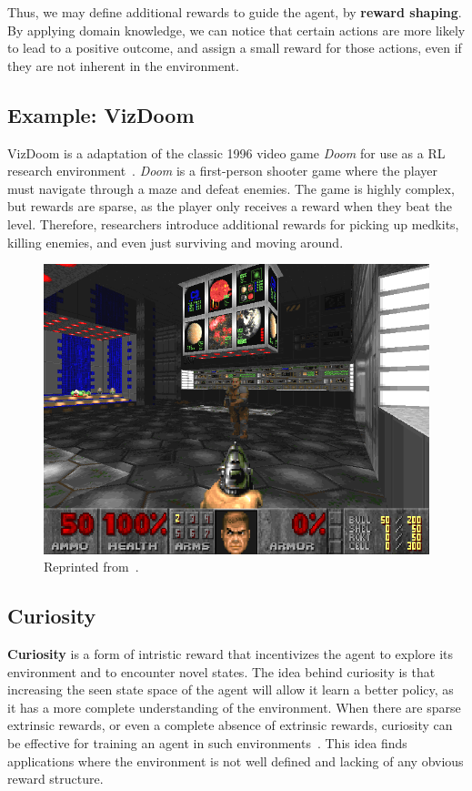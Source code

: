 \documentclass[12pt]{report}
\theoremstyle{definition}
\theoremstyle{remark}
\begin{document}
Thus, we may define additional rewards to guide the agent, by \textbf{reward shaping}. By applying domain knowledge, we can notice that certain actions are more likely to lead to a positive outcome, and assign a small reward for those actions, even if they are not inherent in the environment.

\subsection{Example: VizDoom}

VizDoom is a adaptation of the classic 1996 video game \textit{Doom} for use as a RL research environment~\cite{kempka_vizdoom_2016}. \textit{Doom} is a first-person shooter game where the player must navigate through a maze and defeat enemies. The game is highly complex, but rewards are sparse, as the player only receives a reward when they beat the level. Therefore, researchers introduce additional rewards for picking up medkits, killing enemies, and even just surviving and moving around.

\begin{figure}[h]
    \centering
    \includegraphics[width=0.5\linewidth]{figs/doom.png}
    \caption{Reprinted from~\cite{kempka_vizdoom_2016}.}
    \label{fig:enter-label}
\end{figure}

\subsection{Curiosity}
\textbf{Curiosity} is a form of intristic reward that incentivizes the agent to explore its environment and to encounter novel states. The idea behind curiosity is that increasing the seen state space of the agent will allow it learn a better policy, as it has a more complete understanding of the environment. When there are sparse extrinsic rewards, or even a complete absence of extrinsic rewards, curiosity can be effective for training an agent in such environments~\cite{pathak_curiosity-driven_2017}. This idea finds applications where the environment is not well defined and lacking of any obvious reward structure.
\end{document}
